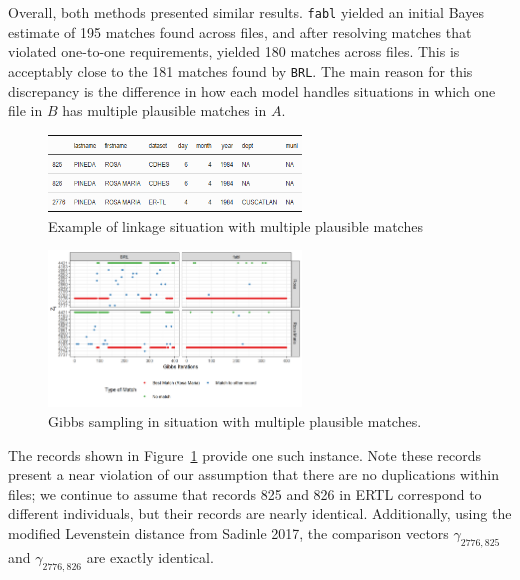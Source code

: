 \documentclass[12pt,letterpaper]{article}
\newcommand{\1}[1]{\mathbb{I}\!\left[#1\right]} %
\begin{document}
Overall, both methods presented similar results. \texttt{fabl} yielded
an initial Bayes estimate of 195 matches found across files, and after
resolving matches that violated one-to-one requirements, yielded 180
matches across files. This is acceptably close to the 181 matches found
by \texttt{BRL}. The main reason for this discrepancy is the difference
in how each model handles situations in which one file in \(B\) has
multiple plausible matches in \(A\).

\begin{figure}[t]
	
	{\centering \includegraphics[width=0.6\textwidth]{../notes/figures/el_salvador/rosa_records} 
		
	}
	
	\caption{Example of linkage situation with multiple plausible matches}\label{fig:rosa-maria}
\end{figure}

\begin{figure}[t]
	
	{\centering \includegraphics[width=0.6\textwidth]{../notes/figures/el_salvador/bad_mixing} 
		
	}
	
	\caption{Gibbs sampling in situation with multiple plausible matches.}\label{fig:mixing-plot}
\end{figure}

The records shown in Figure~\ref{fig:rosa-maria} provide one such instance. Note these
records present a near violation of our assumption that there are no
duplications within files; we continue to assume that records 825 and
826 in ERTL correspond to different individuals, but their records are
nearly identical. Additionally, using the modified Levenstein distance
from Sadinle 2017, the comparison vectors \(\gamma_{2776, 825}\) and
\(\gamma_{2776, 826}\) are exactly identical.
\end{document}
